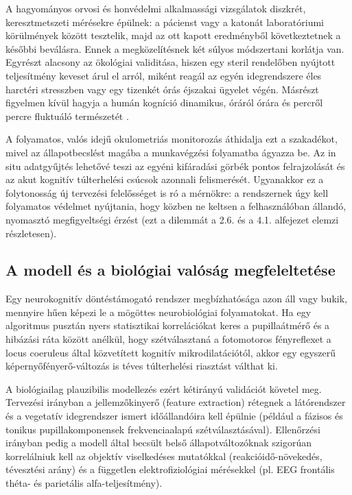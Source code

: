 \documentclass[12pt,a4paper,oneside]{book}
\begin{document}
A hagyományos orvosi és honvédelmi alkalmassági vizsgálatok diszkrét, keresztmetszeti mérésekre épülnek: a pácienst vagy a katonát laboratóriumi körülmények között tesztelik, majd az ott kapott eredményből következtetnek a későbbi beválásra. Ennek a megközelítésnek két súlyos módszertani korlátja van. Egyrészt alacsony az ökológiai validitása, hiszen egy steril rendelőben nyújtott teljesítmény keveset árul el arról, miként reagál az egyén idegrendszere éles harctéri stresszben vagy egy tizenkét órás éjszakai ügyelet végén. Másrészt figyelmen kívül hagyja a humán kogníció dinamikus, óráról órára és percről percre fluktuáló természetét \cite{laCerra1998}.

A folyamatos, valós idejű okulometriás monitorozás áthidalja ezt a szakadékot, mivel az állapotbecslést magába a munkavégzési folyamatba ágyazza be. Az in situ adatgyűjtés lehetővé teszi az egyéni kifáradási görbék pontos felrajzolását és az akut kognitív túlterhelési csúcsok azonnali felismerését. Ugyanakkor ez a folytonosság új tervezési felelősséget is ró a mérnökre: a rendszernek úgy kell folyamatos védelmet nyújtania, hogy közben ne keltsen a felhasználóban állandó, nyomasztó megfigyeltségi érzést (ezt a dilemmát a 2.6. és a 4.1. alfejezet elemzi részletesen).

\subsection{A modell és a biológiai valóság megfeleltetése}

Egy neurokognitív döntéstámogató rendszer megbízhatósága azon áll vagy bukik, mennyire hűen képezi le a mögöttes neurobiológiai folyamatokat. Ha egy algoritmus pusztán nyers statisztikai korrelációkat keres a pupillaátmérő és a hibázási ráta között anélkül, hogy szétválasztaná a fotomotoros fényreflexet a locus coeruleus által közvetített kognitív mikrodilatációtól, akkor egy egyszerű képernyőfényerő-változás is téves túlterhelési riasztást válthat ki.

A biológiailag plauzibilis modellezés ezért kétirányú validációt követel meg. Tervezési irányban a jellemzőkinyerő (feature extraction) rétegnek a látórendszer és a vegetatív idegrendszer ismert időállandóira kell épülnie (például a fázisos és tonikus pupillakomponensek frekvenciaalapú szétválasztásával). Ellenőrzési irányban pedig a modell által becsült belső állapotváltozóknak szigorúan korrelálniuk kell az objektív viselkedéses mutatókkal (reakcióidő-növekedés, tévesztési arány) és a független elektrofiziológiai mérésekkel (pl. EEG frontális théta- és parietális alfa-teljesítmény).
\end{document}
